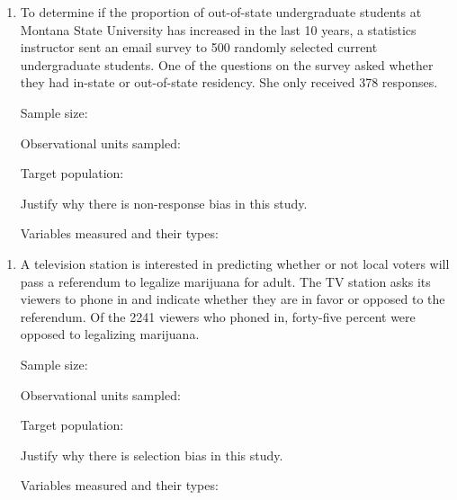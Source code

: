 \documentclass[
]{report}
\begin{document}
\begin{enumerate}
\def\labelenumi{\arabic{enumi}.}
\setcounter{enumi}{7}
\item
  To determine if the proportion of out-of-state undergraduate students at Montana State University has increased in the last 10 years, a statistics instructor sent an email survey to 500 randomly selected current undergraduate students. One of the questions on the survey asked whether they had in-state or out-of-state residency. She only received 378 responses.
  \vspace{0.1in}

  Sample size:
  \vspace{0.3in}

  Observational units sampled:
  \vspace{0.3in}

  Target population:
  \vspace{0.3in}

  Justify why there is non-response bias in this study.
  \vspace{0.5in}

  Variables measured and their types:
\end{enumerate}

\vspace{0.5in}

\begin{enumerate}
\def\labelenumi{\arabic{enumi}.}
\setcounter{enumi}{8}
\item
  A television station is interested in predicting whether or not local voters will pass a referendum to legalize marijuana for adult. The TV station asks its viewers to phone in and indicate whether they are in favor or opposed to the referendum. Of the 2241 viewers who phoned in, forty-five percent were opposed to legalizing marijuana.
  \vspace{0.1in}

  Sample size:
  \vspace{0.3in}

  Observational units sampled:
  \vspace{0.3in}

  Target population:
  \vspace{0.3in}

  Justify why there is selection bias in this study.
  \vspace{0.5in}

  Variables measured and their types:
\end{enumerate}
\end{document}
